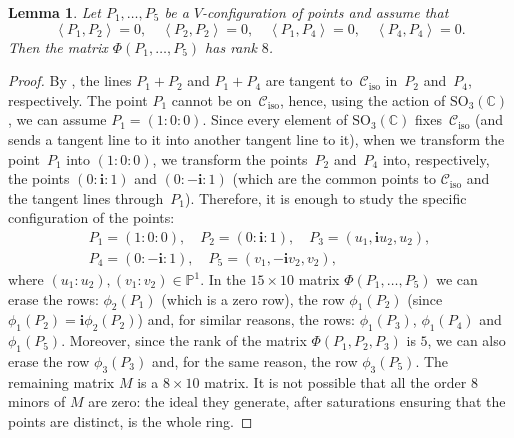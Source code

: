 \documentclass[11pt, a4paper, reqno, captions=tableheading,bibliography=totoc]{scrartcl}
\theoremstyle{plain}
\newtheorem{lemma}{Lemma}[section]
\theoremstyle{definition}
\newcommand{\p}{\mathbb{P}}
\newcommand{\iso}{\mathcal{C}_{\mathrm{iso}}}
\newcommand{\scl}[2]{\left\langle {#1}, {#2} \right\rangle}
\newcommand{\iii}{\textbf{i}}
\begin{document}
\begin{lemma}
\label{lemma:special_case_rank_8}
Let $P_1, \dots, P_5$ be a $V$-configuration of points and assume that
\[
\scl{P_1}{P_2}=0, \quad \scl{P_2}{P_2}=0, \quad \scl{P_1}{P_4}=0,
\quad \scl{P_4}{P_4}=0.
\]
Then the matrix $\Phi(P_1, \dots, P_5)$ has rank $8$.
\end{lemma}
\begin{proof}
By ,
the lines $P_1+P_2$ and $P_1+P_4$ are tangent to~$\iso$ in~$P_2$ and~$P_4$, respectively. The point $P_1$ cannot be on~$\iso$, hence, using the
action of $\mathrm{SO}_3(\mathbb{C})$, we can assume $P_1 = (1: 0: 0)$.
Since every element of $\mathrm{SO}_3(\mathbb{C})$ fixes~$\iso$ (and sends a tangent line to it into another tangent line to it), when we transform the point~$P_1$
into $(1: 0: 0)$, we transform the points~$P_2$ and~$P_4$ into, respectively,
the points $(0: \iii: 1)$ and $(0: -\iii: 1)$ (which are the common points to
$\iso$ and the tangent lines through~$P_1$).
Therefore, it is enough to study the
specific configuration of the points:
%
\begin{gather*}
P_1 = (1: 0: 0), \quad P_2=(0: \iii: 1), \quad P_3=(u_1, \iii u_2, u_2), \\
P_4 = (0: -\iii: 1), \quad P_5 = (v_1, -\iii v_2, v_2),
\end{gather*}
%
where $(u_1: u_2), (v_1: v_2) \in \p^1$.
In the $15\times 10$ matrix $\Phi(P_1, \dots, P_5)$ we can erase the
rows: $\phi_2(P_1)$ (which is a zero row), the row $\phi_1(P_2)$
(since $\phi_1(P_2)=\iii\phi_2(P_2)$) and, for similar reasons, the
rows: $\phi_1(P_3)$, $\phi_1(P_4)$ and $\phi_1(P_5)$.
Moreover, since the rank of the matrix $\Phi(P_1, P_2, P_3)$ is $5$,
we can also erase the row $\phi_3(P_3)$ and, for the same reason, the
row $\phi_3(P_5)$. The remaining matrix $M$ is a $8\times 10$ matrix.
It is not possible that all the order $8$ minors
of $M$ are zero: the ideal they generate, after saturations ensuring that the points are distinct, is the whole ring.
\end{proof}
\end{document}
